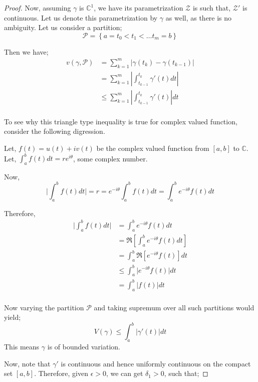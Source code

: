 \documentclass[12pt]{article}
\newcommand{\C}{\mathbb{C}}
\newcommand{\zcal}{\mathcal{Z}}
\theoremstyle{definition}
\newenvironment{note}{
\begin{tcolorbox}[colback=blue!5!white,colframe=blue!75!black,title=Note, parbox = false] }{\end{tcolorbox} }
\begin{document}
\begin{proof}
    Now, assuming $\gamma$ is $\C^1$, we have its parametrization $\zcal$ is such that, $\zcal'$ is continuous. Let us denote this parametrization by $\gamma$ as well, as there is no ambiguity.
    Let us consider a partition;
    $$\mathcal{P} = \left\{ a = t_0 < t_1 < \dots t_m = b \right\}$$

    Then we have;
    \begin{align*}
        v(\gamma, \mathcal{P})
        & = \sum_{k=1}^{m} \vert \gamma(t_k) - \gamma(t_{k-1}) \vert\\
        & = \sum_{k=1}^{m} \left\vert \int_{t_{k-1}}^{t_k} \gamma'(t) dt \right\vert\\
        & \leq \sum_{k=1}^{m} \left\vert \int_{t_{k-1}}^{t_k} \gamma'(t) \right\vert dt\\
    \end{align*}

    To see why this triangle type inequality is true for complex valued function, consider the following digression.
    \begin{note}
        Let, $f(t) = u(t) + i v(t)$ be the complex valued function from $[a, b]$ to $\C$. Let, $\int_{a}^{b} f(t)dt = r e^{i\theta}$, some complex number. 

        Now,
        $$\vert \int_{a}^{b} f(t) dt \vert = r = e^{-i\theta} \int_{a}^{b} f(t)dt = \int_{a}^{b} e^{-i\theta} f(t) dt$$

        Therefore,
        \begin{align*}
            \vert \int_{a}^{b} f(t) dt \vert
            & = \int_{a}^{b} e^{-i\theta} f(t) dt\\
            & = \Re \left[ \int_{a}^{b} e^{-i\theta} f(t) dt \right]\\
            & = \int_{a}^{b} \Re\left[e^{-i\theta} f(t)\right] dt\\
            & \leq \int_{a}^{b} \vert e^{-i\theta} f(t)\vert dt\\
            & = \int_{a}^{b} \vert f(t)\vert dt\\
        \end{align*}
    \end{note}

    Now varying the partition $\mathcal{P}$ and taking supremum over all such partitions would yield;
    $$V(\gamma) \leq \int_{a}^{b} \vert \gamma'(t) \vert dt $$
    This means $\gamma$ is of bounded variation.

    Now, note that $\gamma'$ is continuous and hence uniformly continuous on the compact set $[a, b]$. Therefore, given $\epsilon > 0$, we can get $\delta_1 > 0$, such that;


\end{proof}
\end{document}
